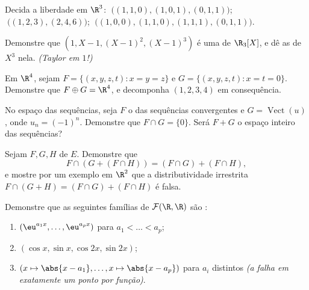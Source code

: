 \begin{exercise}[$\star$]\label{exo:b1:vspaces:3}
Decida a liberdade em $\R^3$: $\;\bigl((1,1,0), (1,0,1),
(0,1,1)\bigr)$; $\;\bigl((1,2,3), (2,4,6)\bigr)$;
$\;\bigl((1,0,0), (1,1,0), (1,1,1), (0,1,1)\bigr)$.
\end{exercise}

\begin{exercise}[$\star$]\label{exo:b1:vspaces:4}
Demonstre que $(1, X - 1, (X-1)^2, (X-1)^3)$ é uma  de $\R_3[X]$,
e dê as  de $X^3$ nela. \emph{(Taylor em $1$!)}
\end{exercise}

\begin{exercise}[$\star\star$]\label{exo:b1:vspaces:5}
Em $\R^4$, sejam $F = \{(x,y,z,t) : x = y = z\}$ e $G = \{(x,y,z,t)
: x = t = 0\}$. Demonstre que $F \oplus G = \R^4$, e decomponha
$(1,2,3,4)$ em consequência.
\end{exercise}

\begin{exercise}[$\star\star$]\label{exo:b1:vspaces:6}
No espaço das sequências, seja $F$ o  das sequências
convergentes e $G = \operatorname{Vect}(u)$, onde $u_n = (-1)^n$. Demonstre que $F \cap G = \{0\}$. Será $F + G$
o espaço inteiro das sequências?
\end{exercise}

\begin{exercise}[$\star\star$]\label{exo:b1:vspaces:7}
Sejam $F, G, H$  de $E$. Demonstre que
\[
F \cap (G + (F \cap H)) = (F \cap G) + (F \cap H),
\]
e mostre por um exemplo em $\R^2$ que a distributividade irrestrita
$F \cap (G + H) = (F\cap G) + (F \cap H)$ é falsa.
\end{exercise}

\begin{exercise}[$\star\star\star$]\label{exo:b1:vspaces:8}
Demonstre que as seguintes famílias de $\mathcal{F}(\R, \R)$ são :
\begin{enumerate}
  \item $(\eu^{a_1 x}, \dots, \eu^{a_p x})$ para $a_1 < \dots < a_p$;
  \item $(\cos x, \sin x, \cos 2x, \sin 2x)$;
  \item $(x \mapsto \abs{x - a_1}, \dots, x \mapsto \abs{x - a_p})$
        para $a_i$ distintos \emph{(a  falha em
        exatamente um ponto por função)}.
\end{enumerate}
\end{exercise}

